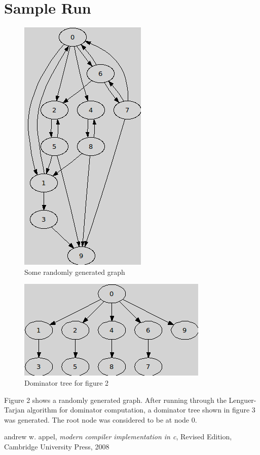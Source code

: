\documentclass[10pt, oneside, a4paper]{article}
\begin{document}
\section{Sample Run}
\begin{figure}[htb]
\begin{center}
\ifpdf
	\includegraphics[scale=0.50]{./cfg.png}
\else
\fi
\caption{Some randomly generated graph}
\label{fig:2}
\end{center}
\end{figure}

\begin{figure}[htb]
\begin{center}
\ifpdf
	\includegraphics[scale=0.50]{./dom.png}
\else
\fi
\caption{Dominator tree for figure 2}
\label{fig:3}
\end{center}
\end{figure}
Figure 2 shows a randomly generated graph.  After running through the Lenguer-Tarjan algorithm for dominator computation, a dominator tree shown in figure 3 was generated.  The root node was considered to be at node 0.

\begin{thebibliography}{10}
 andrew w. appel, \emph{modern compiler implementation in c}, Revised Edition, Cambridge University Press, 2008
\end{thebibliography}
\end{document}
